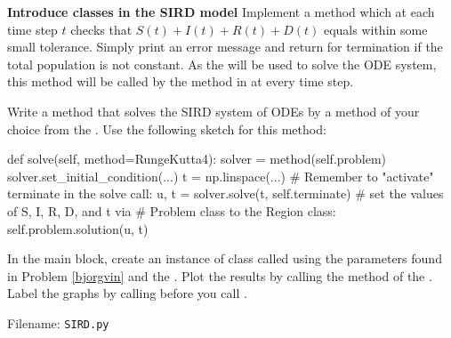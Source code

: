 \begin{Problem}{\textbf{Introduce classes in the SIRD model}}
Implement a method  which at each time step $t$ checks that $S(t)+I(t)+R(t)+D(t)$ equals  within some small tolerance. Simply print an error message and return  for termination if the total population is not constant. As the  will be used to solve the ODE system, this method will be called by the  method in  at every time step.

Write a method  that solves the SIRD system of ODEs by a method of your choice from the . Use the following sketch for this method:

\begin{python}
def solve(self, method=RungeKutta4):
    solver = method(self.problem)
    solver.set_initial_condition(...)
    t = np.linspace(...)
    # Remember to "activate" terminate in the solve call:
    u, t = solver.solve(t, self.terminate)
    # set the values of S, I, R, D, and t via
    # Problem class to the Region class:
    self.problem.solution(u, t)
\end{python}

In the main block, create an instance of class  called  using the parameters found in Problem \ref{bjorgvin} and the . Plot the results by calling the  method of the . Label the graphs by calling  before you call .

Filename: \texttt{SIRD.py}
\end{Problem}


